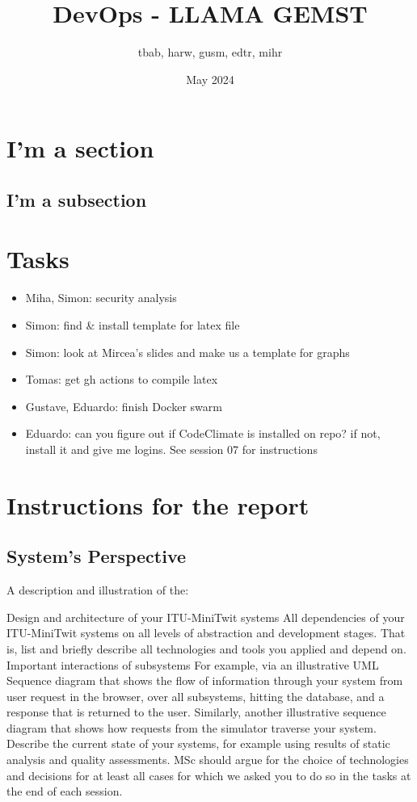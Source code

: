 \documentclass{article}
\title{DevOps - LLAMA GEMST}
\author{tbab, harw, gusm, edtr, mihr}
\date{May 2024}
\begin{document}
\maketitle

\section{I'm a section}
\subsection{I'm a subsection}

\section{Tasks}

\begin{itemize}
  \item Miha, Simon: security analysis
  \item Simon: find \& install template for latex file
  \item Simon: look at Mircea's slides and make us a template for graphs
  \item Tomas: get gh actions to compile latex
  \item Gustave, Eduardo: finish Docker swarm
  \item Eduardo: can you figure out if CodeClimate is installed on repo? if not, install it and give me logins. See session 07 for instructions
\end{itemize}

\section{Instructions for the report}
\subsection{System's Perspective}

A description and illustration of the:

Design and architecture of your ITU-MiniTwit systems
All dependencies of your ITU-MiniTwit systems on all levels of abstraction and development stages. That is, list and briefly describe all technologies and tools you applied and depend on.
Important interactions of subsystems
For example, via an illustrative UML Sequence diagram that shows the flow of information through your system from user request in the browser, over all subsystems, hitting the database, and a response that is returned to the user.
Similarly, another illustrative sequence diagram that shows how requests from the simulator traverse your system.
Describe the current state of your systems, for example using results of static analysis and quality assessments.
MSc should argue for the choice of technologies and decisions for at least all cases for which we asked you to do so in the tasks at the end of each session.
\end{document}
